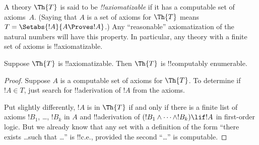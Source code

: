 \documentclass[../../../include/open-logic-section]{subfiles}
\begin{document}

A theory $\Th{T}$ is said to be \emph{!!{axiomatizable}} if it has a
computable set of axioms~$A$. (Saying that $A$ is a set of axioms for
$\Th{T}$ means $T = \Setabs{!A}{A \Proves !A}$.) Any ``reasonable''
axiomatization of the natural numbers will have this property. In
particular, any theory with a finite set of axioms is
!!{axiomatizable}.

\begin{lem}
Suppose $\Th{T}$ is !!{axiomatizable}. Then $\Th{T}$ is !!{computably
enumerable}.
\end{lem}

\begin{proof}
Suppose $A$ is a computable set of axioms for $\Th{T}$. To determine
if $!A \in T$, just search for !!a{derivation} of $!A$ from the axioms.

Put slightly differently, $!A$ is in $\Th{T}$ if and only if there is
a finite list of axioms $!B_1$, \dots, $!B_k$ in $A$ and !!a{derivation} of
$(!B_1 \land \dots \land !B_k) \lif !A$ in first-order logic.  But
we already know that any set with a definition of the form ``there
exists \dots such that \dots'' is !!{c.e.}, provided the second ``\dots''
is computable.
\end{proof}
\end{document}
